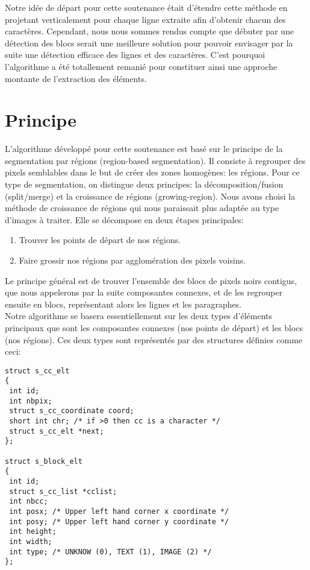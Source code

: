 \documentclass[a4paper,10pt]{report}
\begin{document}
Notre idée de départ pour cette soutenance était d'étendre cette méthode
en projetant verticalement pour chaque ligne extraite afin d'obtenir
chacun des caractères. Cependant, nous nous sommes rendus compte que
débuter par une détection des blocs serait une meilleure solution pour
pouvoir envisager par la suite une détection efficace des lignes et des
caractères. C'est pourquoi l'algorithme a été totallement remanié pour
constituer ainsi une approche montante de l'extraction des éléments.

\section{Principe}
L'algorithme développé pour cette soutenance est basé sur le principe de
la segmentation par régions (region-based segmentation). 
Il consiste à regrouper des pixels semblables dans le but de créer des
zones homogènes: les régions. Pour ce type de
segmentation, on distingue deux principes: la décomposition/fusion
(split/merge) et la croissance de régions (growing-region). Nous avons
choisi la méthode de croissance de régions qui nous paraissait plus
adaptée au type d'images à traiter. Elle se décompose en deux étapes
principales:

  \begin{enumerate}
    \item Trouver les points de départ de nos régions.
    \item Faire grossir nos régions par agglomération des pixels
    voisins.
  \end{enumerate}

Le principe général est de trouver l'ensemble des blocs de pixels noirs
contigus, que nous appelerons par la suite composantes connexes, et de
les regrouper ensuite en blocs, représentant alors les
lignes et les paragraphes. \\
Notre algorithme se basera essentiellement sur les deux types d'éléments
principaux que sont les composantes connexes (nos points de départ) et
les blocs (nos régions). Ces deux types sont représentés par des
structures définies comme ceci:

\begin{lstlisting}
struct s_cc_elt
{
 int id;
 int nbpix;
 struct s_cc_coordinate coord;
 short int chr; /* if >0 then cc is a character */
 struct s_cc_elt *next;
};

struct s_block_elt
{
 int id;
 struct s_cc_list *cclist;
 int nbcc;
 int posx; /* Upper left hand corner x coordinate */
 int posy; /* Upper left hand corner y coordinate */
 int height;
 int width;
 int type; /* UNKNOW (0), TEXT (1), IMAGE (2) */
};
\end{lstlisting}
\end{document}
